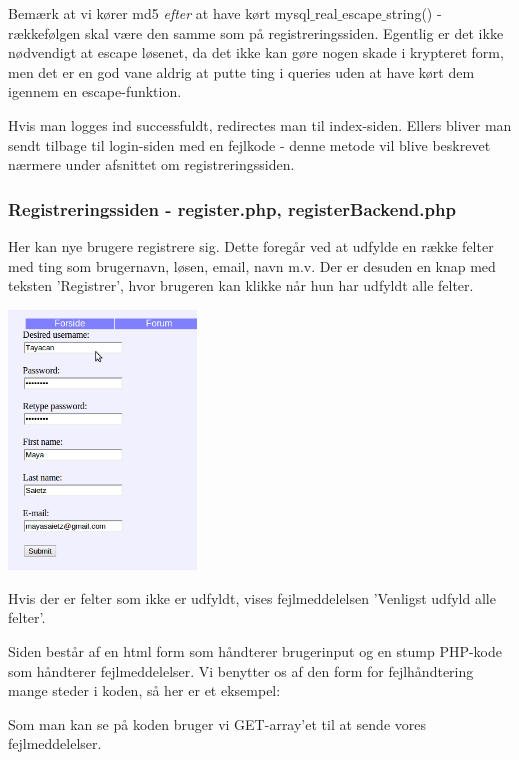 \documentclass{article}
\begin{document}


Bemærk at vi kører md5 \emph{efter} at have kørt mysql$\_$real$\_$escape$\_$string() - rækkefølgen skal være den samme som på registreringssiden. Egentlig er det ikke nødvendigt at escape løsenet, da det ikke kan gøre nogen skade i krypteret form, men det er en god vane aldrig at putte ting i queries uden at have kørt dem igennem en escape-funktion.

Hvis man logges ind successfuldt, redirectes man til index-siden. Ellers bliver man sendt tilbage til login-siden med en fejlkode - denne metode vil blive beskrevet nærmere under afsnittet om registreringssiden.

\subsubsection[Registrerinssiden]{Registreringssiden - register.php, registerBackend.php}
Her kan nye brugere registrere sig. Dette foregår ved at udfylde en række felter med ting som brugernavn, løsen, email, navn m.v. Der er desuden en knap med teksten 'Registrer', hvor brugeren kan klikke når hun har udfyldt alle felter.

\begin{center}
\includegraphics[width=50mm]{mi08.png}
\end{center}

Hvis der er felter som ikke er udfyldt, vises fejlmeddelelsen 'Venligst udfyld alle felter'.

Siden består af en html form som håndterer brugerinput og en stump PHP-kode som håndterer fejlmeddelelser. Vi benytter os af den form for fejlhåndtering mange steder i koden, så her er et eksempel:



Som man kan se på koden bruger vi GET-array'et til at sende vores fejlmeddelelser.
\end{document}
